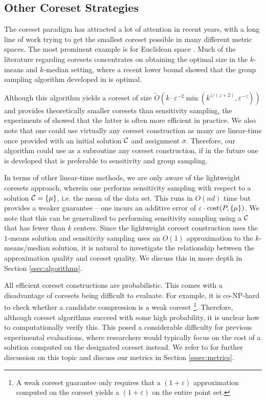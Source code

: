 \subsection{Other Coreset Strategies}
\label{ssec:clustering_prelim}

The coreset paradigm has attracted a lot of attention in recent years, with a long line of work trying to get the smallest coreset possible in many different
metric spaces. The most prominent example is for Euclidean space \cite{BadoiuHI02, HaM04, Chen09, HuangV20, stoc22}. Much of the literature regarding coresets
concentrates on obtaining the optimal size in the $k$-means and $k$-median setting, where a recent lower bound \cite{huangLB} showed that the group sampling
algorithm developed in \cite{stoc21, stoc22} is optimal.

Although this algorithm yields a coreset of size $\tilde{O}(k\cdot \varepsilon^{-2}
\min(k^{z/(z+2)},\varepsilon^{-z}))$ \cite{CLSSS22} and provides theoretically smaller coresets than sensitivity sampling, the experiments of \cite{chrisESA}
showed that the latter is often more efficient in practice. We also note that one could use virtually any coreset construction as many are linear-time once
provided with an initial solution $\mathcal C$ and assignment $\sigma$.  Therefore, our algorithm could use as a subroutine any coreset construction, if in the
future one is developed that is preferable to sensitivity and group sampling.

In terms of other linear-time methods, we are only aware of the lightweight coresets approach\cite{BachemL018}, wherein one performs sensitivity sampling with
respect to a solution $\mathcal C=\{\mu\}$, i.e. the mean of the data set. This runs in $O(nd)$ time but provides a weaker guarantee -- one incurs an additive error
of $\varepsilon\cdot \operatorname{cost}(P,\{\mu\})$.  We note that this can be generalized to performing sensitivity sampling using a $\mathcal C$ that has fewer than $k$
centers. Since the lightweight coreset construction uses the $1$-means solution and sensitivity sampling uses an $O(1)$ approximation to the $k$-means/median
solution, it is natural to investigate the relationship between the approximation quality and coreset quality. We discuss this in more depth in Section
\ref{ssec:algorithms}.

All efficient coreset constructions are probabilistic. This comes with a disadvantage of coresets being difficult to evaluate. For example, it is
co-NP-hard to check whether a candidate compression is a weak coreset \cite{chrisESA} \footnote{A weak coreset guarantee only requires that a $(1+\varepsilon)$
approximation computed on the coreset yields a $(1+\varepsilon)$ on the entire point set.}. Therefore, although coreset algorithms succeed with some high
probability, it is unclear how to computationally verify this.  This posed a considerable difficulty for previous experimental evaluations,
where researchers would typically focus on the cost of a solution computed on the designated coreset instead. We refer to \cite{chrisESA} for further discussion
on this topic and discuss our metrics in Section \ref{sssec:metrics}.

